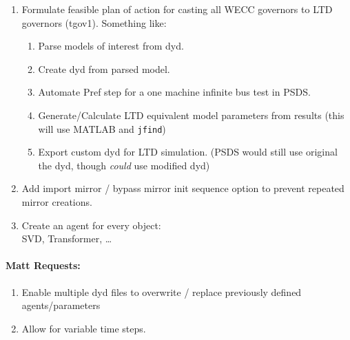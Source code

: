 \documentclass[12pt]{article}
\begin{document}
\begin{multicols}{2}
\begin{enumerate}
		\item Formulate feasible plan of action for casting all WECC governors to LTD governors (tgov1). Something like:
		\begin{enumerate}
		\item Parse models of interest from dyd.
		\item Create dyd from parsed model.
		\item Automate Pref step for a one machine infinite bus test in PSDS.
		\item Generate/Calculate LTD equivalent model parameters from results (this will use MATLAB and \verb|jfind|)
		\item Export custom dyd for LTD simulation. (PSDS would still use original the dyd, though \emph{could} use modified dyd)
		\end{enumerate}

		\item Add import mirror / bypass mirror init sequence option to prevent repeated mirror creations.

		\item Create an agent for every object: \\ SVD, Transformer, \ldots
		
	\end{enumerate}

\paragraph{Matt Requests:}
\begin{enumerate}
		\item Enable multiple dyd files to overwrite / replace previously defined agents/parameters
		\item Allow for variable time steps.
\end{enumerate}
		
		



\vfill\null

\end{multicols}
\pagebreak
\end{document}
